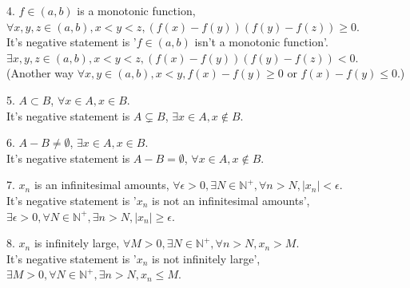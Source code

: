  	4. $ f\in (a,b) $ is a monotonic function, $ \forall x,y,z \in (a,b), x<y<z, (f(x)-f(y))(f(y)-f(z))\ge 0 $.\\
 	It's negative statement is '$ f\in (a,b) $ isn't a monotonic function'. $ \exists x,y,z \in (a,b), x<y<z, (f(x)-f(y))(f(y)-f(z))< 0 $.\\
 	(Another way $ \forall x,y \in (a,b), x<y, f(x)-f(y)\ge 0 \text{ or } f(x)-f(y)\le 0 $.)
 	
 	5. $ A \subset B $, $ \forall x\in A, x\in B $.\\
 	It's negative statement is $ A \subsetneq B $, $ \exists x\in A, x\notin B $.
 	
 	6. $ A-B\neq \emptyset $, $ \exists x\in A, x\in B $.\\
 	It's negative statement is $ A-B = \emptyset $, $ \forall x\in A, x\notin B $.
 	
 	7. {$ x_n $} is an infinitesimal amounts, $ \forall \epsilon >0, \exists N\in \mathbb{N}^+, \forall n>N, |x_n|<\epsilon $.\\
 	It's negative statement is '{$ x_n $} is not an infinitesimal amounts', $ \exists \epsilon >0, \forall N\in \mathbb{N}^+, \exists n>N, |x_n|\ge\epsilon $.
 	
 	8. {$ x_n $} is infinitely large, $ \forall M >0, \exists N\in \mathbb{N}^+, \forall n>N, x_n>M $.\\
 	It's negative statement is '{$ x_n $} is not infinitely large', $ \exists M >0, \forall N\in \mathbb{N}^+, \exists n>N, x_n\le M $.
 	